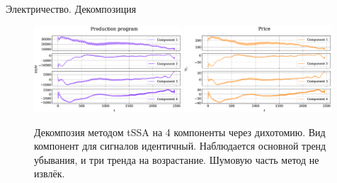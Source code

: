 	\begin{frame}{Электричество. Декомпозиция}
		
		\begin{figure}[h]
			\centering
			
			\includegraphics[width=0.49\textwidth, keepaspectratio]{img/electricity/tssa/decomposition/Production_program.eps} 
			\includegraphics[width=0.49\textwidth, keepaspectratio]{img/electricity/tssa/decomposition/Price.eps}    
			
			\caption{Декомпозия методом tSSA на 4 компоненты через дихотомию. Вид компонент для сигналов идентичный. Наблюдается основной тренд убывания, и три тренда на возрастание. Шумовую часть метод не извлёк.}
		\end{figure}
		
	\end{frame}
	
